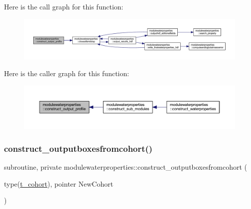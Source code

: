 Here is the call graph for this function\+:\nopagebreak
\begin{figure}[H]
\begin{center}
\leavevmode
\includegraphics[width=350pt]{namespacemodulewaterproperties_a0df2c60cf00ccbb52f0db0aa65924c93_cgraph}
\end{center}
\end{figure}
Here is the caller graph for this function\+:\nopagebreak
\begin{figure}[H]
\begin{center}
\leavevmode
\includegraphics[width=350pt]{namespacemodulewaterproperties_a0df2c60cf00ccbb52f0db0aa65924c93_icgraph}
\end{center}
\end{figure}
\mbox{\label{namespacemodulewaterproperties_a6f39106e418f143aa0c8fc86f0756562}} 
\subsubsection{\texorpdfstring{construct\+\_\+outputboxesfromcohort()}{construct\_outputboxesfromcohort()}}
{\footnotesize\ttfamily subroutine, private modulewaterproperties\+::construct\+\_\+outputboxesfromcohort (\begin{DoxyParamCaption}\item[{type(\mbox{\hyperlink{structmodulewaterproperties_1_1t__cohort}{t\+\_\+cohort}}), pointer}]{New\+Cohort }\end{DoxyParamCaption})\hspace{0.3cm}{\ttfamily [private]}}

